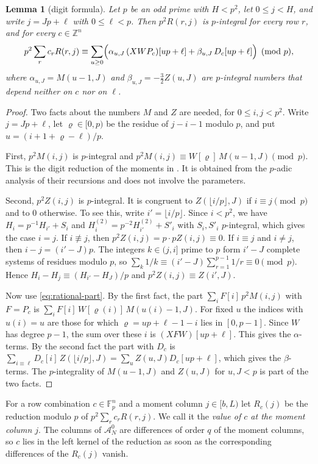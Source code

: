 \documentclass[11pt]{amsart}
\newtheorem{lemma}[theorem]{Lemma}
\theoremstyle{definition}
\theoremstyle{remark}
\numberwithin{equation}{section}
\newcommand{\Z}{\mathbb Z}
\newcommand{\F}{\mathbb F}
\newcommand{\cA}{\mathcal A}
\begin{document}
\begin{lemma}[digit formula]\label{lem:digits}
Let $p$ be an odd prime with $H<p^2$, let $0\le j<H$, and write $j=Jp+\ell$ with $0\le\ell<p$. Then
$p^2R(r,j)$ is $p$-integral for every row $r$, and for every $c\in\Z^n$
\[
 p^2\sum_rc_rR(r,j)\equiv\sum_{u\ge0}\Bigl(\alpha_{u,J}\,(XWP_c)[up+\ell]+\beta_{u,J}\,D_c[up+\ell]\Bigr)
 \pmod p ,
\]
where $\alpha_{u,J}=M(u-1,J)$ and $\beta_{u,J}=-\tfrac32Z(u,J)$ are $p$-integral numbers that depend neither
on $c$ nor on $\ell$.
\end{lemma}

\begin{proof}
Two facts about the numbers $M$ and $Z$ are needed, for $0\le i,j<p^2$. Write $j=Jp+\ell$, let
$\varrho\in[0,p)$ be the residue of $j-i-1$ modulo $p$, and put $u=(i+1+\varrho-\ell)/p$.

First, $p^2M(i,j)$ is $p$-integral and $p^2M(i,j)\equiv W[\varrho]\,M(u-1,J)\pmod p$. This is the digit
reduction of the moments in \cite[\S3]{OpenAI2026}. It is obtained from the $p$-adic analysis of their
recursions and does not involve the parameters.

Second, $p^2Z(i,j)$ is $p$-integral. It is congruent to $Z(\lfloor i/p\rfloor,J)$ if $i\equiv j\pmod p$ and
to $0$ otherwise. To see this, write $i'=\lfloor i/p\rfloor$. Since $i<p^2$, we have $H_i=p^{-1}H_{i'}+S_i$
and $H^{(2)}_i=p^{-2}H^{(2)}_{i'}+S'_i$ with $S_i,S'_i$ $p$-integral, which gives the case $i=j$. If
$i\not\equiv j$, then $p^2Z(i,j)=p\cdot pZ(i,j)\equiv0$. If $i\equiv j$ and $i\ne j$, then $i-j=(i'-J)p$. The
integers $k\in(j,i]$ prime to $p$ form $i'-J$ complete systems of residues modulo $p$, so
$\sum_k1/k\equiv(i'-J)\sum_{r=1}^{p-1}1/r\equiv0\pmod p$. Hence $H_i-H_j\equiv(H_{i'}-H_J)/p$ and
$p^2Z(i,j)\equiv Z(i',J)$.

Now use \eqref{eq:rational-part}. By the first fact, the part $\sum_iF[i]\,p^2M(i,j)$ with $F=P_c$ is
$\sum_iF[i]\,W[\varrho(i)]\,M(u(i)-1,J)$. For fixed $u$ the indices with $u(i)=u$ are those for which
$\varrho=up+\ell-1-i$ lies in $[0,p-1]$. Since $W$ has degree $p-1$, the sum over these $i$ is
$(XFW)[up+\ell]$. This gives the $\alpha$-terms. By the second fact the part with $D_c$ is
$\sum_{i\equiv\ell}D_c[i]\,Z(\lfloor i/p\rfloor,J)=\sum_uZ(u,J)D_c[up+\ell]$, which gives the $\beta$-terms.
The $p$-integrality of $M(u-1,J)$ and $Z(u,J)$ for $u,J<p$ is part of the two facts.
\end{proof}

For a row combination $c\in\F_p^n$ and a moment column $j\in[b,L)$ let $R_c(j)$ be the reduction modulo
$p$ of $p^2\sum_rc_rR(r,j)$. We call it the \emph{value of $c$ at the moment column $j$}. The columns of
$\cA^0_N$ are differences of order $q$ of the moment columns, so $c$ lies in the left kernel of the
reduction as soon as the corresponding differences of the $R_c(j)$ vanish.
\end{document}
